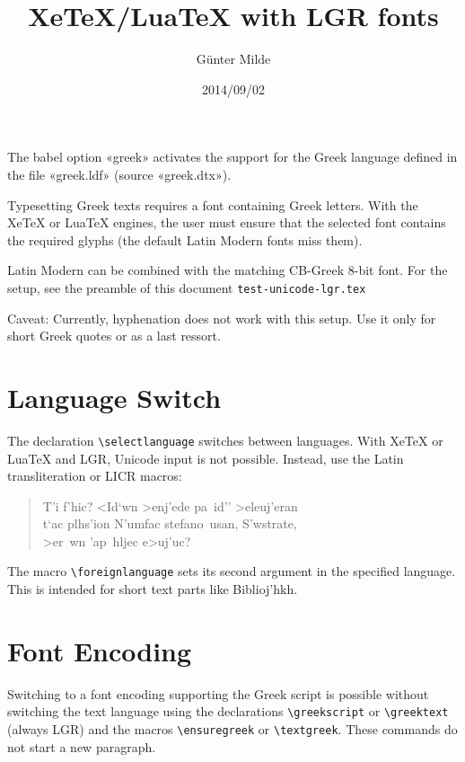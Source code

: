 \documentclass[a4paper]{article}
\begin{document}
\title{XeTeX/LuaTeX with LGR fonts}
\author{Günter Milde}
\date{2014/09/02}
\maketitle

The babel option «greek» activates the support for the Greek language
defined in the file «greek.ldf» (source «greek.dtx»).

Typesetting Greek texts requires a font containing Greek letters. With the
XeTeX or LuaTeX engines, the user must ensure that the selected font
contains the required glyphs (the default Latin Modern fonts miss them).

Latin Modern can be combined with the matching CB-Greek 8-bit font. For the
setup, see the preamble of this document \texttt{test-unicode-lgr.tex}

Caveat: Currently, hyphenation does not work with this setup. Use it only
for short Greek quotes or as a last ressort.

\section{Language Switch}

The declaration \verb|\selectlanguage| switches between languages. With
XeTeX or LuaTeX and LGR, Unicode input is not possible. Instead, use the
Latin transliteration or LICR macros:

\begin{quote}
  T'i f'hic? <Id`wn >enj'ede pa~id'' >eleuj'eran\\
  t`ac plhs'ion N'umfac stefano~usan, S'wstrate,\\
  >er~wn 'ap~hljec e>uj'uc?
\end{quote}

The macro \verb|\foreignlanguage| sets its second argument in the specified
language. This is intended for short text parts like
\foreignlanguage{greek}{Biblioj'hkh}.

\section{Font Encoding}

Switching to a font encoding supporting the Greek script is possible without
switching the text language using the declarations \verb|\greekscript| or
\verb|\greektext| (always LGR) and the macros \verb|\ensuregreek| or
\verb|\textgreek|. These commands do not start a new paragraph.
\end{document}

